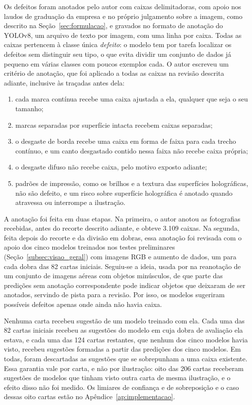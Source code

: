 \documentclass[
    12pt,                %
    openright,           %
    oneside,             %
    a4paper,             %
    english,             %
    brazil               %
]{abntex2}
\begin{document}
Os defeitos foram anotados pelo autor com caixas delimitadoras, com
apoio nos laudos de graduação da empresa e no próprio julgamento sobre
a imagem, como descrito na Seção~\ref{sec:formulacao}, e gravados no
formato de anotação do YOLOv8, um arquivo de texto por imagem, com uma
linha por caixa. Todas as caixas pertencem à classe única
\textit{defeito}: o modelo tem por tarefa localizar os defeitos sem distinguir seu
tipo, o que evita dividir um conjunto de dados já pequeno em várias
classes com poucos exemplos cada. O autor escreveu um critério de anotação, que foi aplicado a todas as caixas na revisão descrita adiante, inclusive às traçadas antes dela:

\begin{enumerate}
    \item cada marca contínua recebe uma caixa ajustada a ela, qualquer
    que seja o seu tamanho;
    \item marcas separadas por superfície intacta recebem caixas
    separadas;
    \item o desgaste de borda recebe uma caixa em forma de faixa para
    cada trecho contínuo, e um canto desgastado contido nessa faixa não
    recebe caixa própria;
    \item o desgaste difuso não recebe caixa, pelo motivo exposto
    adiante;
    \item padrões de impressão, como os brilhos e a textura das
    superfícies holográficas, não são defeito, e um risco sobre
    superfície holográfica é anotado quando atravessa ou interrompe a ilustração.
\end{enumerate}

A anotação foi feita em duas etapas. Na primeira, o autor anotou as
fotografias recebidas, antes do recorte descrito adiante, e obteve
3.109 caixas. Na segunda, feita depois do recorte e da divisão em
dobras, essa anotação foi revisada com o apoio dos cinco modelos
treinados nos testes preliminares (Seção~\ref{subsec:visao_geral}) com
imagens RGB e aumento de dados, um para cada dobra das 82 cartas
iniciais. Seguiu-se a ideia, usada por  na
reanotação de um conjunto de imagens aéreas com objetos minúsculos, de que parte das predições sem anotação correspondente pode indicar objetos que deixaram de ser anotados, servindo de pista para a revisão. Por isso, os modelos sugeriram possíveis
defeitos apenas onde ainda não havia caixa.

Nenhuma carta recebeu sugestão de um modelo treinado com ela. Cada uma
das 82 cartas iniciais recebeu as sugestões do modelo em cuja dobra de
avaliação ela estava, e cada uma das 124 cartas restantes, que nenhum
dos cinco modelos havia visto, recebeu sugestões formadas a partir das
predições dos cinco modelos. Em todas, foram descartadas as sugestões
que se sobrepunham a uma caixa existente. Essa garantia vale por carta,
e não por ilustração: oito das 206 cartas receberam sugestões de
modelos que tinham visto outra carta de mesma ilustração, e o efeito
disso não foi medido. Os limiares de confiança e de sobreposição e o
caso dessas oito cartas estão no Apêndice~\ref{ap:implementacao}.
\end{document}
